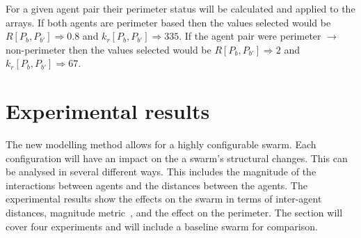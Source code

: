 \documentclass[12pt,a4paper]{IEEEtran}
\newcommand{\kr}{\mathit{k_r}}
\newcommand{\rb}{\mathit{R}}
\begin{document}
For a given agent pair their perimeter status will be calculated and applied to the arrays. If both agents are perimeter based then the values selected would be $\rb[P_b,P_{b'}]\Rightarrow 0.8$ and $\kr[P_b,P_{b'}]\Rightarrow 335$. If the agent pair were perimeter $\rightarrow$ non-perimeter then the values selected would be $\rb[P_b,P_{b'}]\Rightarrow 2$ and $\kr[P_b,P_{b'}]\Rightarrow 67$.\\

\section{Experimental results\label{sec:ExperimentalResults}}
The new modelling method allows for a highly configurable swarm. Each configuration will have an impact on the a swarm's structural changes. This can be analysed in several different ways. This includes the magnitude of the interactions between agents and the distances between the agents. The experimental results show the effects on the swarm in terms of inter-agent distances, magnitude metric~\cite{eliot2018metric}, and the effect on the perimeter. The section will cover four experiments and will include a baseline swarm for comparison.
\end{document}
